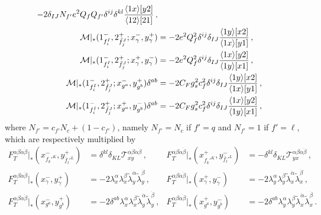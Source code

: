 \begin{subappendices}
\begin{align}
    -2\delta_{IJ} N_{f'}e^2Q_f Q_{f'}\delta^{ij}\delta^{kl} \frac{ \langle 1 x \rangle\lbrack y 2 \rbrack}{\langle 1 2 \rangle\lbrack 2 1 \rbrack}\,,  \\
    \mathcal M|_*(1^-_{f_i^I},2^+_{\bar f_j^J};x^-_\gamma,y^+_\gamma) &= -2e^2Q_f^2\delta^{ij}\delta_{IJ}\frac{\langle 1 y \rangle\lbrack x 2 \rbrack}{\langle 1 x \rangle\lbrack y 1 \rbrack}\,, \\
    \mathcal M|_*(1^-_{f_i^I},2^+_{\bar f_j^J};x^+_\gamma,y^-_\gamma) &= -2e^2Q_f^2\delta^{ij}\delta_{IJ}\frac{\langle 1 x \rangle\lbrack y 2 \rbrack}{\langle 1 y \rangle\lbrack x 1 \rbrack}\,,\\
    \mathcal M|_*(1^-_{f_i^I},2^+_{\bar f_j^J};x^-_{g^a},y^+_{g^b})\delta^{ab} &= -2C_Fg_s^2c_f^2\delta^{ij}\delta_{IJ}\frac{\langle 1 y \rangle\lbrack x 2 \rbrack}{\langle 1 x \rangle\lbrack y 1 \rbrack}\,, \\
    \mathcal M|_*(1^-_{f_i^I},2^+_{\bar f_j^J};x^+_{g^a},y^-_{g^b})\delta^{ab} &= -2C_Fg_s^2c_f^2\delta^{ij}\delta_{IJ}\frac{\langle 1 x \rangle\lbrack y 2 \rbrack}{\langle 1 y \rangle\lbrack x 1 \rbrack}\,,
\end{align}
where $N_{f'}=c_{f'}N_c + (1 - c_{f'})$, namely $N_{f'}=N_c$ if $f'=q$ and $N_{f'}=1$ if
$f'=\ell$, which are respectively multiplied by
\begin{align}
    F_T^{\alpha\beta\dot\alpha\dot\beta}|_{*}(x_{f_k'^K}^{-},y_{\bar f_l'^L}^{+}) &= \delta^{kl}\delta_{KL}\mathcal T^{\alpha\beta\dot\alpha\dot\beta}_{xy} \,,&
    F_T^{\alpha\beta\dot\alpha\dot\beta}|_{*}(x_{f_k'^K}^{+},y_{\bar f_l'^L}^{-}) &= -\delta^{kl}\delta_{KL}\mathcal T^{\alpha\beta\dot\alpha\dot\beta}_{yx}\,,\\
    F_T^{\alpha\beta\dot\alpha\dot\beta}|_{*}(x_{\gamma}^{-},y_{\gamma}^{+}) &= -2\lambda_x^\alpha \lambda_x^\beta \widetilde\lambda_y^{\dot\alpha} \widetilde\lambda_y^{\dot\beta}\,, &
    F_T^{\alpha\beta\dot\alpha\dot\beta}|_{*}(x_{\gamma}^{+},y_{\gamma}^{-}) &= -2\lambda_y^\alpha \lambda_y^\beta \widetilde\lambda_x^{\dot\alpha} \widetilde\lambda_x^{\dot\beta}\,, \\
    F_T^{\alpha\beta\dot\alpha\dot\beta}|_{*}(x_{g^a}^{-},y_{g^b}^{+}) &= -2\delta^{ab}\lambda_x^\alpha \lambda_x^\beta \widetilde\lambda_y^{\dot\alpha} \widetilde\lambda_y^{\dot\beta}\,, &
    F_T^{\alpha\beta\dot\alpha\dot\beta}|_{*}(x_{g^a}^{+},y_{g^b}^{-}) &= -2\delta^{ab}\lambda_y^\alpha \lambda_y^\beta \widetilde\lambda_x^{\dot\alpha} \widetilde\lambda_x^{\dot\beta}
    \,.
\end{align}


\end{subappendices}
